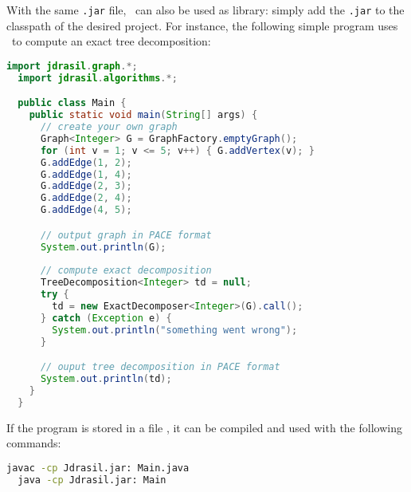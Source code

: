 \documentclass[a4paper, ukenglish, twoside, openright]{jdrasilmanual}
\begin{document}
With the same \texttt{.jar} file, \Jdrasil\ can also be used as
library: simply add the \texttt{.jar} to the classpath of the desired
project. For instance, the following simple program uses \Jdrasil\ to
compute an exact tree decomposition:
\begin{lstlisting}[language=Java]
  import jdrasil.graph.*;
  import jdrasil.algorithms.*;

  public class Main {
    public static void main(String[] args) {
      // create your own graph
      Graph<Integer> G = GraphFactory.emptyGraph();
      for (int v = 1; v <= 5; v++) { G.addVertex(v); }
      G.addEdge(1, 2);
      G.addEdge(1, 4);
      G.addEdge(2, 3);
      G.addEdge(2, 4);
      G.addEdge(4, 5);

      // output graph in PACE format
      System.out.println(G);
      
      // compute exact decomposition
      TreeDecomposition<Integer> td = null;
      try {
        td = new ExactDecomposer<Integer>(G).call();
      } catch (Exception e) {
        System.out.println("something went wrong");
      }

      // ouput tree decomposition in PACE format
      System.out.println(td);
    }
  }
\end{lstlisting}
If the program is stored in a file , it can be
compiled and used with the following commands:
\begin{lstlisting}[language=bash]
  javac -cp Jdrasil.jar: Main.java
  java -cp Jdrasil.jar: Main
\end{lstlisting}
\end{document}
